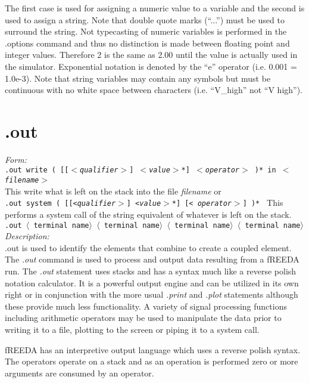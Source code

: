 The first case is used for assigning a numeric value to a variable
and the second is used to assign a string.  Note that double quote
marks (``...'') must be used to surround the string.  Not
typecasting of numeric variables is performed in the .options
command and thus no distinction is made between floating point and
integer values. Therefore 2 is the same as 2.00 until the value is
actually used in the simulator.  Exponential notation is denoted
by the ``e'' operator (i.e. 0.001 = 1.0e-3). Note that string
variables may contain any symbols but must be continuous with no
white space between characters (i.e. ``V\_high'' not ``V high'').

\clearpage
\section{.out}
\noindent\textit{Form:}\\
{\tt .out write ( [[$<${\it qualifier}$>$] $<${\it value}$>$*]
$<${\it operator}$>$ )*
      in $<${\it filename}$>$} \\
This write what is left on the stack into the file {\it filename}
or \\
{\tt .out system ( [[<{\it qualifier}$>$] <{\it value}$>$*] [<{\it
operator}$>$] )* } This performs a system call of the string
equivalent of whatever is left on
the stack.  \\
\newline
{\tt .out $\langle$ \tt{terminal\ name}$\rangle$ $\langle$
\tt{terminal\ name}$\rangle$ $\langle$ \tt{terminal\
name}$\rangle$ $\langle$ \tt{terminal\ name}$\rangle$}\\[0.2in]
\newline
\textit{Description:}\\
.out is used to identify the elements that combine to create a coupled element.\\[0.2in]

The {\em .out} command is used to process and output data
resulting from a fREEDA run.  The {\em .out} statement uses stacks
and has a syntax much like a reverse polish notation calculator.
It is a powerful output engine and can be utilized in its own
right or in conjunction with the more usual {\em .print} and {\em
.plot} statements although these provide much less functionality.
A variety of signal processing functions including arithmetic
operators may be used to manipulate the data prior to writing it
to a file, plotting to the screen or piping it to a system call.

fREEDA has an interpretive output language which uses a reverse
polish syntax. The operators operate on a stack and as an
operation is performed zero or more arguments are consumed by an
operator.

